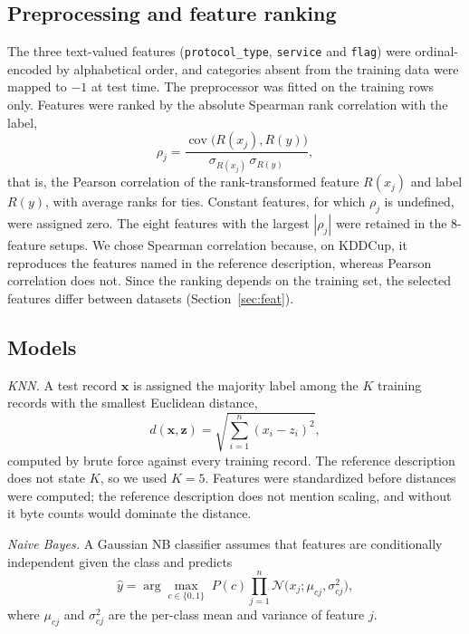 \documentclass[conference]{IEEEtran}
\begin{document}
\subsection{Preprocessing and feature ranking}
The three text-valued features (\texttt{protocol\_type}, \texttt{service} and \texttt{flag}) were ordinal-encoded by alphabetical order, and categories absent from the training data were mapped to $-1$ at test time. The preprocessor was fitted on the training rows only. Features were ranked by the absolute Spearman rank correlation with the label,
\begin{equation}
  \rho_j = \frac{\operatorname{cov}\!\big(R(x_j),R(y)\big)}{\sigma_{R(x_j)}\,\sigma_{R(y)}},
  \label{eq:spearman}
\end{equation}
that is, the Pearson correlation of the rank-transformed feature $R(x_j)$ and label $R(y)$, with average ranks for ties. Constant features, for which $\rho_j$ is undefined, were assigned zero. The eight features with the largest $|\rho_j|$ were retained in the 8-feature setups. We chose Spearman correlation because, on KDDCup, it reproduces the features named in the reference description, whereas Pearson correlation does not. Since the ranking depends on the training set, the selected features differ between datasets (Section~\ref{sec:feat}).

\subsection{Models}
\emph{KNN.} A test record $\mathbf{x}$ is assigned the majority label among the $K$ training records with the smallest Euclidean distance,
\begin{equation}
  d(\mathbf{x},\mathbf{z}) = \sqrt{\textstyle\sum_{i=1}^{n}(x_i - z_i)^2},
  \label{eq:euclid}
\end{equation}
computed by brute force against every training record. The reference description does not state $K$, so we used $K=5$. Features were standardized before distances were computed; the reference description does not mention scaling, and without it byte counts would dominate the distance.

\emph{Naive Bayes.} A Gaussian NB classifier assumes that features are conditionally independent given the class and predicts
\begin{equation}
  \hat{y} = \arg\max_{c\in\{0,1\}} \; P(c)\prod_{j=1}^{n}\mathcal{N}\!\big(x_j;\mu_{cj},\sigma_{cj}^2\big),
  \label{eq:nb}
\end{equation}
where $\mu_{cj}$ and $\sigma_{cj}^2$ are the per-class mean and variance of feature $j$.
\end{document}
